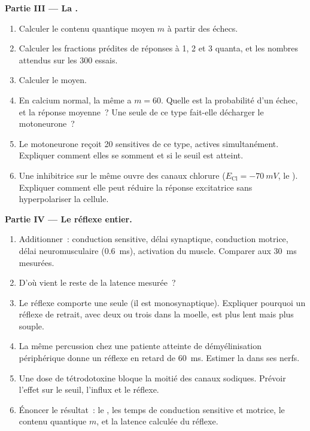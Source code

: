 \begin{problem}
\medskip
\noindent\textbf{Partie III --- La .}
\begin{enumerate}[resume]
  \item Calculer le contenu quantique moyen $m$ à partir des échecs.
  \item Calculer les fractions prédites de réponses à 1, 2 et 3
        quanta, et les nombres attendus sur les 300 essais.
  \item Calculer le  moyen.
  \item En calcium normal, la même  a $m = 60$. Quelle est la
        probabilité d'un échec, et la réponse moyenne~? Une seule 
        de ce type fait-elle décharger le motoneurone~?
  \item Le motoneurone reçoit \num{20}  sensitives de ce type,
        actives simultanément. Expliquer comment elles se somment et si
        le seuil est atteint.
  \item Une  inhibitrice sur le même  ouvre des canaux
        chlorure ($E_{\mathrm{Cl}} = \qty{-70}{mV}$, le ). Expliquer comment elle peut réduire la réponse
        excitatrice sans hyperpolariser la cellule.
\end{enumerate}

\medskip
\noindent\textbf{Partie IV --- Le réflexe entier.}
\begin{enumerate}[resume]
  \item Additionner~: conduction sensitive, délai synaptique, conduction
        motrice, délai neuromusculaire (\qty{0.6}{ms}), activation du
        muscle. Comparer aux \qty{30}{ms} mesurées.
  \item D'où vient le reste de la latence mesurée~?
  \item Le réflexe comporte une seule  (il est monosynaptique).
        Expliquer pourquoi un réflexe de retrait, avec deux ou trois
         dans la moelle, est plus lent mais plus souple.
  \item La même percussion chez une patiente atteinte de démyélinisation
        périphérique donne un réflexe en retard de \qty{60}{ms}. Estimer
        la  dans ses nerfs.
  \item Une dose de tétrodotoxine bloque la moitié des canaux sodiques.
        Prévoir l'effet sur le seuil, l'influx et le réflexe.
  \item Énoncer le résultat~: le , les temps de
        conduction sensitive et motrice, le contenu quantique $m$, et la
        latence calculée du réflexe.
\end{enumerate}
\end{problem}
